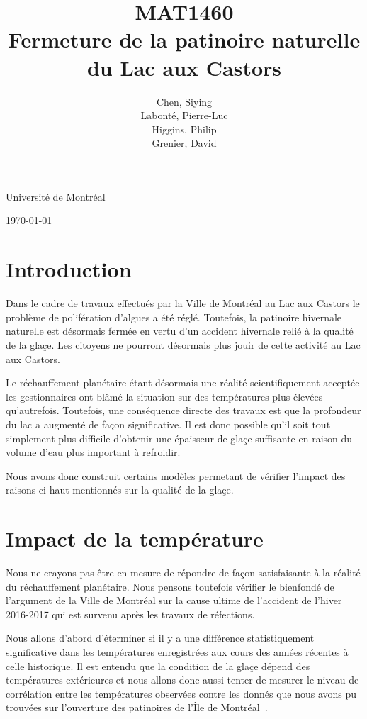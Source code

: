\documentclass[12pt]{article}
\title{MAT1460\\[3ex]Fermeture de la patinoire naturelle du Lac aux Castors}
\author{Chen, Siying\\[1ex] Labont\'e, Pierre-Luc\\[1ex]Higgins, Philip\\[1ex] Grenier, David}
\date{}
\numberwithin{figure}{section}
\begin{document}
\maketitle
\thispagestyle{empty}
\vfill
\begin{center}
Universit\'e de Montr\'eal

\today
\end{center}
\clearpage

\tableofcontents
\newpage
\section{Introduction}

Dans le cadre de travaux effectu\'es par la Ville de Montr\'eal au Lac aux Castors le probl\`eme de
polif\'eration d'algues a \'et\'e r\'egl\'e. Toutefois, la patinoire hivernale naturelle est
d\'esormais ferm\'ee en vertu d'un accident hivernale reli\'e \`a la qualit\'e de la gla\c ce. Les
citoyens ne pourront d\'esormais plus jouir de cette activit\'e au Lac aux Castors.

Le r\'echauffement plan\'etaire \'etant d\'esormais une r\'ealit\'e scientifiquement accept\'ee les
gestionnaires ont bl\^am\'e la situation sur des temp\'eratures plus \'elev\'ees qu'autrefois.
Toutefois, une cons\'equence directe des travaux est que la profondeur du lac a augment\'e de fa\c
con significative. Il est donc possible qu'il soit tout simplement plus difficile d'obtenir une
\'epaisseur de gla\c ce suffisante en raison du volume d'eau plus important \`a refroidir.

Nous avons donc construit certains mod\`eles permetant de v\'erifier l'impact des raisons
ci-haut mentionn\'es sur la qualit\'e de la gla\c ce.

\section{Impact de la temp\'erature}

Nous ne crayons pas \^etre en mesure de r\'epondre de fa\c con satisfaisante \`a la r\'ealit\'e du
r\'echauffement plan\'etaire. Nous pensons toutefois v\'erifier le bienfond\'e de l'argument de la
Ville de Montr\'eal sur la cause ultime de l'accident de l'hiver 2016-2017 qui est survenu apr\`es
les travaux de r\'efections.

Nous allons d'abord d'\'eterminer si il y a une diff\'erence statistiquement significative dans les
temp\'eratures enregistr\'ees aux cours des ann\'ees r\'ecentes \`a celle historique. Il est entendu
que la condition de la gla\c ce d\'epend des temp\'eratures ext\'erieures et nous allons donc aussi
tenter de mesurer le niveau de corr\'elation entre les temp\'eratures observ\'ees contre les
donn\'es que nous avons pu trouv\'ees sur l'ouverture des patinoires de l'\^Ile de
Montr\'eal~\cite{PatHist}.
\end{document}
